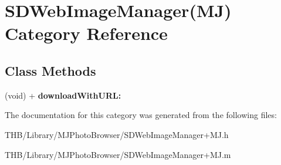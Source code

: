 \hypertarget{category_s_d_web_image_manager_07_m_j_08}{}\section{S\+D\+Web\+Image\+Manager(MJ) Category Reference}
\label{category_s_d_web_image_manager_07_m_j_08}
\subsection*{Class Methods}
\begin{DoxyCompactItemize}
\item 
\mbox{\label{category_s_d_web_image_manager_07_m_j_08_a3c23176eb59f5ada330f9a033f1dd730}} 
(void) + {\bfseries download\+With\+U\+R\+L\+:}
\end{DoxyCompactItemize}


The documentation for this category was generated from the following files\+:\begin{DoxyCompactItemize}
\item 
T\+H\+B/\+Library/\+M\+J\+Photo\+Browser/S\+D\+Web\+Image\+Manager+\+M\+J.\+h\item 
T\+H\+B/\+Library/\+M\+J\+Photo\+Browser/S\+D\+Web\+Image\+Manager+\+M\+J.\+m\end{DoxyCompactItemize}
